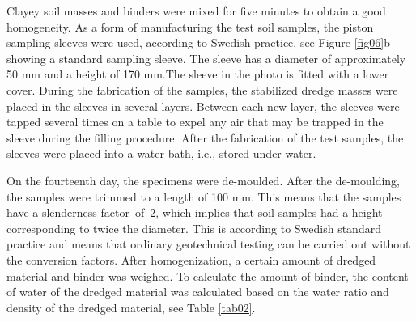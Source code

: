 \documentclass[sustainability,article,accept,pdftex,moreauthors]{Definitions/mdpi}
\begin{document}
{Clayey soil masses and binders were mixed for {five} minutes to obtain a good homogeneity. As a form of manufacturing the test {soil samples}, the piston sampling sleeves were used, according to Swedish practice, see Figure \ref{fig06}b showing a standard sampling sleeve. The sleeve has a diameter of approximately 50 mm and a height of 170 mm.\linebreak  The sleeve in the photo is fitted with a lower cover. During the fabrication of the samples, the stabilized dredge masses were placed in the sleeves in several layers. Between each new layer, the sleeves were tapped several times {on a table }to expel any air that may be trapped in the sleeve during {the }filling {procedure}. After the fabrication of the test samples, the sleeves were placed into a water bath, i.e., stored under water. 

On the fourteenth day, the specimens were de-moulded. After {the }de-moulding, the samples were trimmed to a length of 100 mm. This means that the samples have a slenderness factor~of~2, {which implies that soil} samples {had} a height corresponding to twice the diameter. This is according to Swedish standard practice and means that ordinary geotechnical testing can be carried out without the conversion factors. After homogenization, a certain amount of dredged material and binder was weighed. To calculate the amount of binder, the {content of }water of the dredged material was calculated based on the water ratio and density of the dredged material, see Table \ref{tab02}.

}
\end{document}

